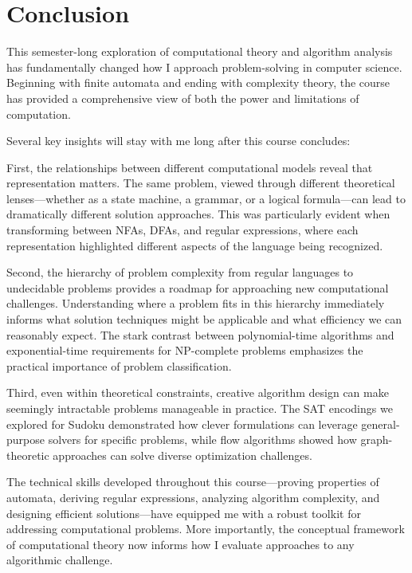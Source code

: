 \documentclass{article}
\theoremstyle{theorem}
\theoremstyle{definition}
\theoremstyle{remark}
\begin{document}
\section{Conclusion}\label{conclusion}

This semester-long exploration of computational theory and algorithm analysis has fundamentally changed how I approach problem-solving in computer science. Beginning with finite automata and ending with complexity theory, the course has provided a comprehensive view of both the power and limitations of computation.

Several key insights will stay with me long after this course concludes:

First, the relationships between different computational models reveal that representation matters. The same problem, viewed through different theoretical lenses—whether as a state machine, a grammar, or a logical formula—can lead to dramatically different solution approaches. This was particularly evident when transforming between NFAs, DFAs, and regular expressions, where each representation highlighted different aspects of the language being recognized.

Second, the hierarchy of problem complexity from regular languages to undecidable problems provides a roadmap for approaching new computational challenges. Understanding where a problem fits in this hierarchy immediately informs what solution techniques might be applicable and what efficiency we can reasonably expect. The stark contrast between polynomial-time algorithms and exponential-time requirements for NP-complete problems emphasizes the practical importance of problem classification.

Third, even within theoretical constraints, creative algorithm design can make seemingly intractable problems manageable in practice. The SAT encodings we explored for Sudoku demonstrated how clever formulations can leverage general-purpose solvers for specific problems, while flow algorithms showed how graph-theoretic approaches can solve diverse optimization challenges.

The technical skills developed throughout this course—proving properties of automata, deriving regular expressions, analyzing algorithm complexity, and designing efficient solutions—have equipped me with a robust toolkit for addressing computational problems. More importantly, the conceptual framework of computational theory now informs how I evaluate approaches to any algorithmic challenge.
\end{document}
